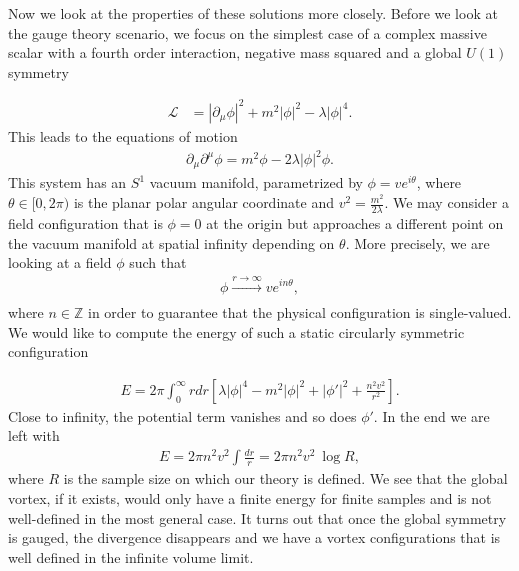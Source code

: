         Now we look at the properties of these solutions more closely. Before we look at the gauge theory scenario, we focus on the simplest case of a complex massive scalar with a fourth order interaction, negative mass squared and a global $U(1)$ symmetry

        \begin{align}
            \mathcal{L} &=  \left|\partial_{\mu} \phi \right|^2 + m^2 | \phi |^2 - \lambda |\phi|^4.
        \end{align}
    This leads to the equations of motion
    \begin{align}
        \partial_{\mu} \partial^{\mu} \phi = m^2 \phi - 2\lambda |\phi|^2 \phi.
    \end{align}
    This system has an $S^1$ vacuum manifold, parametrized by $\phi = v e^{i \theta}$, where $\theta \in [0,2\pi)$ is the planar polar angular coordinate and $v^2 = \frac{m^2}{2 \lambda}$. We may consider a field configuration that is $\phi=0$ at the origin but approaches a different point on the vacuum manifold at spatial infinity depending on $\theta$. More precisely, we are looking at a field $\phi$ such that
    \begin{align}
        \phi \xrightarrow[]{r\rightarrow \infty} v e^{i n\theta},
    \end{align}
    where $n \in \mathbb{Z}$ in order to guarantee that the physical configuration is single-valued.
    We would like to compute the energy of such a static circularly symmetric configuration

    \begin{align}
        E= 2 \pi \int_0^{\infty} r dr \left[\lambda |\phi|^4 - m^2 |\phi|^2 + |\phi'|^2 + \frac{n^2 v^2}{r^2} \right].
    \end{align}
    Close to infinity, the potential term vanishes and so does $\phi'$. In the end we are left with
    \begin{align}
        E = 2\pi n^2 v^2 \int \frac{dr}{r} =  2\pi n^2 v^2  \ \log R,
    \end{align}
    where $R$ is the sample size on which our theory is defined. We see that the global vortex, if it exists, would only have a finite energy for finite samples and is not well-defined in the most general case. It turns out that once the global symmetry is gauged, the divergence disappears and we have a vortex configurations that is well defined in the infinite volume limit.

